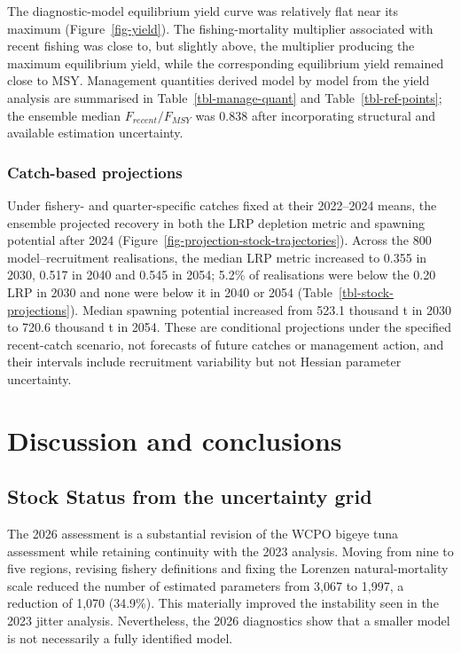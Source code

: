 \documentclass[
  english,
  a4paper,
  a4paper,
  11pt]{SCreport}
\newcounter{none} %
\begin{document}
The diagnostic-model equilibrium yield curve was relatively flat near
its maximum (Figure~\ref{fig-yield}). The fishing-mortality multiplier
associated with recent fishing was close to, but slightly above, the
multiplier producing the maximum equilibrium yield, while the
corresponding equilibrium yield remained close to MSY. Management
quantities derived model by model from the yield analysis are summarised
in Table~\ref{tbl-manage-quant} and Table~\ref{tbl-ref-points}; the
ensemble median \(F_{recent}/F_{MSY}\) was 0.838 after incorporating
structural and available estimation uncertainty.

\subsubsection{Catch-based projections}\label{sec-projection-results}

Under fishery- and quarter-specific catches fixed at their 2022--2024
means, the ensemble projected recovery in both the LRP depletion metric
and spawning potential after 2024
(Figure~\ref{fig-projection-stock-trajectories}). Across the 800
model--recruitment realisations, the median LRP metric increased to
0.355 in 2030, 0.517 in 2040 and 0.545 in 2054; 5.2\% of realisations
were below the 0.20 LRP in 2030 and none were below it in 2040 or 2054
(Table~\ref{tbl-stock-projections}). Median spawning potential increased
from 523.1 thousand t in 2030 to 720.6 thousand t in 2054. These are
conditional projections under the specified recent-catch scenario, not
forecasts of future catches or management action, and their intervals
include recruitment variability but not Hessian parameter uncertainty.

\section{Discussion and conclusions}\label{sec-discussion}

\subsection{Stock Status from the uncertainty
grid}\label{stock-status-from-the-uncertainty-grid}

The 2026 assessment is a substantial revision of the WCPO bigeye tuna
assessment while retaining continuity with the 2023 analysis. Moving
from nine to five regions, revising fishery definitions and fixing the
Lorenzen natural-mortality scale reduced the number of estimated
parameters from 3,067 to 1,997, a reduction of 1,070 (34.9\%). This
materially improved the instability seen in the 2023 jitter analysis.
Nevertheless, the 2026 diagnostics show that a smaller model is not
necessarily a fully identified model.
\end{document}
